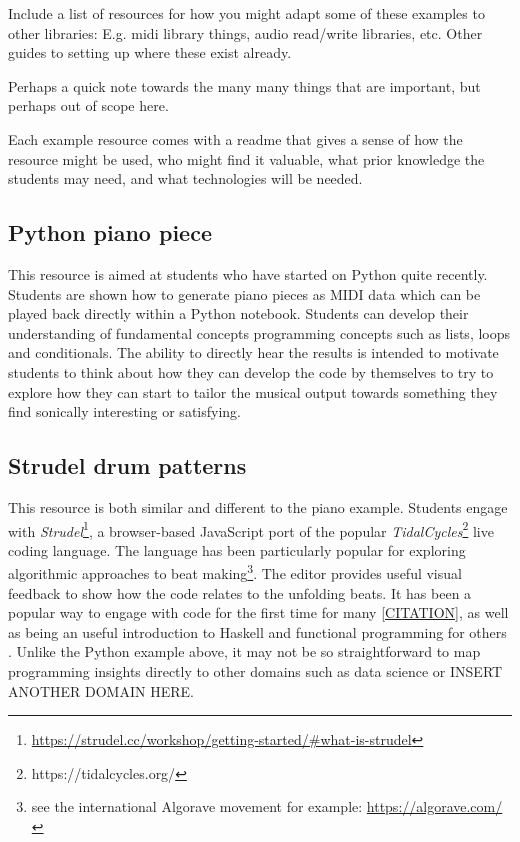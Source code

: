 
Include a list of resources for how you might adapt some of these examples to other libraries:
E.g. midi library things, audio read/write libraries, etc.
Other guides to setting up where these exist already.

Perhaps a quick note towards the many many things that are important, but perhaps out of scope here.

Each example resource comes with a readme that gives a sense of how the resource might be used, who might find it valuable, what prior knowledge the students may need, and what technologies will be needed.

\subsection{Python piano piece}
This resource is aimed at students who have started on Python quite recently. Students are shown how to generate piano pieces as MIDI data which can be played back directly within a Python notebook. Students can develop their understanding of fundamental concepts programming concepts such as lists, loops and conditionals. The ability to directly hear the results is intended to motivate students to think about how they can develop the code by themselves to try to explore how they can start to tailor the musical output towards something they find sonically interesting or satisfying.

\subsection{Strudel drum patterns}
This resource is both similar and different to the piano example. Students engage with \emph{Strudel}\footnote{\url{https://strudel.cc/workshop/getting-started/\#what-is-strudel}}, a browser-based JavaScript port of the popular \emph{TidalCycles}\footnote{https://tidalcycles.org/} live coding language. The language has been particularly popular for exploring algorithmic approaches to beat making\footnote{see the international Algorave movement for example: \url{https://algorave.com/}}. The editor provides useful visual feedback to show how the code relates to the unfolding beats. It has been a popular way to engage with code for the first time for many \ref{CITATION}, as well as being an useful introduction to Haskell and functional programming for others \cite{CITATION}. Unlike the Python example above, it may not be so straightforward to map programming insights directly to other domains such as data science or INSERT ANOTHER DOMAIN HERE.

